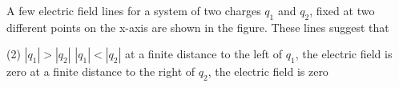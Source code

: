 
\item A few electric field lines for a system of two charges \( q_1 \) and \( q_2 \), fixed at two different points on the x-axis are shown in the figure. These lines suggest that
    \begin{center}
    \end{center}
    \begin{tasks}(2)
        \task \( |q_1| > |q_2| \)
        \task \( |q_1| < |q_2| \)
        \task at a finite distance to the left of \( q_1 \), the electric field is zero
        \task at a finite distance to the right of \( q_2 \), the electric field is zero
    \end{tasks}
